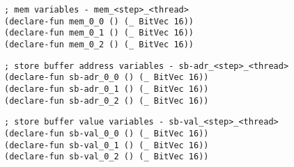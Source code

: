 \begin{lstlisting}[language=SMTLib]
; mem variables - mem_<step>_<thread>
(declare-fun mem_0_0 () (_ BitVec 16))
(declare-fun mem_0_1 () (_ BitVec 16))
(declare-fun mem_0_2 () (_ BitVec 16))
\end{lstlisting}


\begin{algorithm}[H]
\end{algorithm}

\begin{algorithm}[H]
\end{algorithm}

\begin{lstlisting}[language=SMTLib]
; store buffer address variables - sb-adr_<step>_<thread>
(declare-fun sb-adr_0_0 () (_ BitVec 16))
(declare-fun sb-adr_0_1 () (_ BitVec 16))
(declare-fun sb-adr_0_2 () (_ BitVec 16))
\end{lstlisting}


\begin{algorithm}[H]
\end{algorithm}

\begin{algorithm}[H]
\end{algorithm}

\begin{lstlisting}[language=SMTLib]
; store buffer value variables - sb-val_<step>_<thread>
(declare-fun sb-val_0_0 () (_ BitVec 16))
(declare-fun sb-val_0_1 () (_ BitVec 16))
(declare-fun sb-val_0_2 () (_ BitVec 16))
\end{lstlisting}


